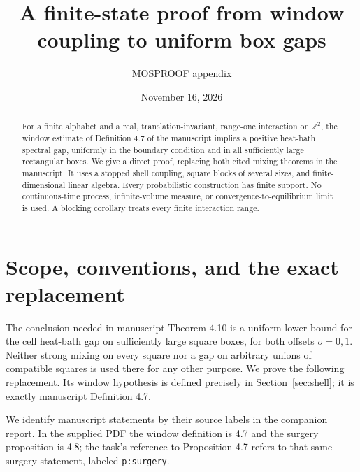 \documentclass[11pt]{amsart}
\title{A finite-state proof from window coupling to uniform box gaps}
\author{MOSPROOF appendix}
\date{November 16, 2026}
\theoremstyle{definition}
\newcommand{\Z}{\mathbb Z}
\newcommand{\1}{\mathbf 1}
\begin{document}
\begin{abstract}
For a finite alphabet and a real, translation-invariant, range-one interaction
on $\Z^2$, the window estimate of Definition 4.7 of the manuscript implies a
positive heat-bath spectral gap, uniformly in the boundary condition and in
all sufficiently large rectangular boxes. We give a direct proof, replacing
both cited mixing theorems in the manuscript. It uses a stopped shell
coupling, square blocks of several sizes, and finite-dimensional linear
algebra. Every probabilistic construction has finite support. No
continuous-time process, infinite-volume measure, or convergence-to-equilibrium
limit is used. A blocking corollary treats every finite interaction range.
\end{abstract}
\maketitle

\section{Scope, conventions, and the exact replacement}
\label{sec:scope}

The conclusion needed in manuscript Theorem 4.10 is a uniform lower bound for
the cell heat-bath gap on sufficiently large square boxes, for both offsets
$o=0,1$. Neither strong mixing on every square nor a gap on arbitrary unions
of compatible squares is used there for any other purpose. We prove the
following replacement. Its window hypothesis is defined precisely in
Section~\ref{sec:shell}; it is exactly manuscript Definition 4.7.

We identify manuscript statements by their source labels in the companion
report. In the supplied PDF the window definition is 4.7 and the surgery
proposition is 4.8; the task's reference to Proposition 4.7 refers to that
same surgery statement, labeled \texttt{p:surgery}.
\end{document}
